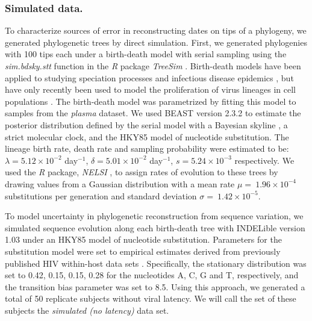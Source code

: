 \documentclass{bmcart}
\begin{document}
\subsubsection * {Simulated data.} \label{subsec:simdata}


To characterize sources of error in reconstructing dates on tips of a phylogeny, we generated phylogenetic trees by direct simulation. %
First, we generated phylogenies with 100 tips each under a birth-death model with serial sampling using the \emph{sim.bdsky.stt} function in the \textit{R} package \textit{TreeSim} \cite{Boskova14}.
Birth-death models have been applied to studying speciation processes \cite{Nee:2006} and infectious disease epidemics \cite{Stradler13}, but have only recently been used to model the proliferation of virus lineages in cell populations \cite{Hartfield:2015}.
The birth-death model was parametrized by fitting this model to samples from the {\em plasma} dataset.
We used BEAST version 2.3.2 \cite{BEAST2} to estimate the posterior distribution defined by the serial model with a Bayesian skyline \cite{Stadler13}, a strict molecular clock, and the HKY85 \cite{HKY85} model of nucleotide substitution.
The lineage birth rate, death rate and sampling probability were estimated to be: $\lambda = 5.12 \times 10^{-2}$ day$^{-1}$, $\delta = 5.01 \times 10^{-2}$ day$^{-1}$, $s = 5.24 \times 10^{-3}$ respectively.
We used the \textit{R} package, \emph{NELSI} \cite{NELSI}, to assign rates of evolution to these trees by drawing values from a Gaussian distribution with a mean rate $\mu = \ 1.96\times 10^{-4}$ substitutions per generation and standard deviation $\sigma = \ 1.42\times 10^{-5}$. %

To model uncertainty in phylogenetic reconstruction from sequence variation, we simulated sequence evolution along each birth-death tree with INDELible version 1.03 \cite{Indelible09} under an HKY85 \cite{HKY85} model of nucleotide substitution.
Parameters for the substitution model were set to empirical estimates derived from previously published HIV within-host data sets \cite{McCloskey14}. 
Specifically, the stationary distribution was set to 0.42, 0.15, 0.15, 0.28 for the nucleotides A, C, G and T, respectively, and the transition bias parameter was set to 8.5.
Using this approach, we generated a total of 50 replicate subjects without viral latency.
We will call the set of these subjects the \emph{simulated (no latency)} data set.
\end{document}

